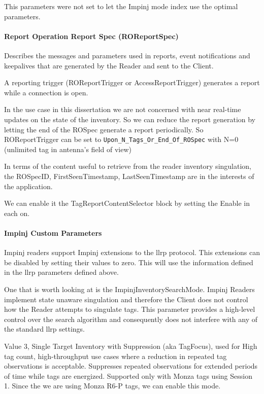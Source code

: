 This parameters were not set to let the Impinj mode index use the optimal parameters.

\paragraph{Report Operation Report Spec (ROReportSpec)}

Describes the messages and parameters used in reports, event notifications and keepalives that are generated by the Reader and sent to the Client.

A reporting trigger (ROReportTrigger or AccessReportTrigger) generates a report while a connection is open.

In the use case in this dissertation we are not concerned with near real-time updates on the state of the inventory. So we can reduce the report generation by letting the end of the ROSpec generate a report periodically.
So ROReportTrigger can be set to \texttt{Upon\_N\_Tags\_Or\_End\_Of\_ROSpec} with N=0 (unlimited tag in antenna's field of view)~\cite[sec. 14.2.1]{LowLevelReader}

In terms of the content useful to retrieve from the reader inventory singulation, the ROSpecID, FirstSeenTimestamp, LastSeenTimestamp are in the interests of the application.

We can enable it the TagReportContentSelector block by setting the Enable in each on.

\paragraph{Impinj Custom Parameters}

Impinj readers support Impinj extensions to the \ac{llrp} protocol. This extensions can be disabled by setting their values to zero. This will use the information defined in the \ac{llrp} parameters defined above.

One that is worth looking at is the ImpinjInventorySearchMode.
Impinj Readers implement state unaware singulation and therefore the Client does not control how the Reader attempts to singulate tags. This parameter provides a high-level control over the search algorithm and consequently does not interfere with any of the standard \ac{llrp} settings.~\cite[sec. 4.3.3]{ImpinjOctaneLLRP}

Value 3, Single Target Inventory with Suppression (aka TagFocus), used for High tag count, high-throughput use cases where a reduction in repeated tag observations is acceptable. Suppresses repeated observations for extended periods of time while tags are energized. Supported only with Monza tags using Session 1. Since the we are using Monza R6-P tags, we can enable this mode.

